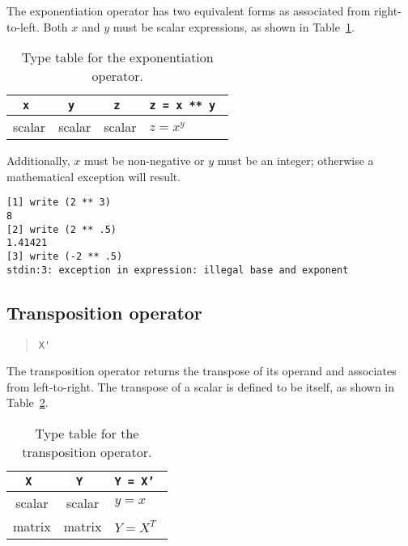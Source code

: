 The exponentiation operator has two equivalent forms as associated from
right-to-left.  Both $x$ and $y$ must be scalar expressions, as shown
in Table~\ref{burlap.exponentiation.types}.

\begin{table}[htbp]
\begin{center}
\begin{tabular}{c|c|c|l}
\tt x  & \tt y  & \tt z  & \tt z = x ** y	\\
\hline
scalar & scalar & scalar & $z = x^y$		\\
\end{tabular}
\caption{Type table for the exponentiation operator.}
\label{burlap.exponentiation.types}
\end{center}
\end{table}

Additionally, $x$ must be non-negative or $y$ must be an integer;
otherwise a mathematical exception will result.

\begin{screen}
\begin{verbatim}
[1] write (2 ** 3)
8
[2] write (2 ** .5)
1.41421
[3] write (-2 ** .5)
stdin:3: exception in expression: illegal base and exponent
\end{verbatim}
\end{screen}


\subsection{Transposition operator}
\label{burlap.op.transposition}

\begin{quote}
\begin{verbatim}
X'
\end{verbatim}
\end{quote}

The transposition operator returns the transpose of its operand and
associates from left-to-right.  The transpose of a scalar is defined
to be itself, as shown in Table~\ref{burlap.transposition.types}.

\begin{table}[htbp]
\begin{center}
\begin{tabular}{c|c|l}
\tt X  & \tt Y  & \tt Y = X'	\\
\hline
scalar & scalar & $y = x$	\\
matrix & matrix & $Y = X^T$	\\
\end{tabular}
\caption{Type table for the transposition operator.}
\label{burlap.transposition.types}
\end{center}
\end{table}


